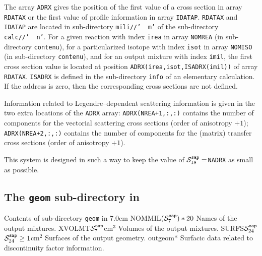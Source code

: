 The array {\tt ADRX} gives the position of the first value of a cross section in array {\tt RDATAX}
or the first value of profile information in array {\tt IDATAP}. {\tt RDATAX} and {\tt IDATAP} are
located in sub-directory {\tt mili//'~~m'} of the sub-directory {\tt calc//'~~n'}.
For a given reaction with index {\tt irea} in array {\tt NOMREA} (in sub-directory {\tt contenu}),
for a particularized isotope with index {\tt isot} in array {\tt NOMISO} (in sub-directory {\tt contenu}),
and for an output mixture with index {\tt imil}, the first cross section value is located at position
{\tt ADRX(irea,isot,ISADRX(imil))} of array {\tt RDATAX}. {\tt ISADRX} is defined in the sub-directory
{\tt info} of an elementary calculation. If the address is zero, then the corresponding cross sections
are not defined.

\vskip 0.1cm

Information related to Legendre--dependent scattering information is given in the two
extra locations of the {\tt ADRX} array: {\tt ADRX(NREA+1,:,:)} contains the number of components for the
vectorial scattering cross sections (order of anisotropy $+1$); {\tt ADRX(NREA+2,:,:)} contains the
num\-ber of components for the (matrix) transfer cross sections (order of anisotropy $+1$).

\vskip 0.1cm

This system is designed in such a way to keep the value of $\mathcal{S}^{\tt sap}_{18}=${\tt NADRX} as
small as possible.

\newpage
\subsection{The {\tt geom} sub-directory in }\label{sect:sapdirgeom}

\vskip -0.5cm

\begin{DescriptionEnregistrement}{Contents of sub-directory {\tt geom} in }{7.0cm}
\CharEnr
  {NOMMIL}{$(\mathcal{S}^{\tt sap}_7)*20$}
  {Names of the output mixtures.}
\RealEnr
  {XVOLMT}{$\mathcal{S}^{\tt sap}_7$}{cm$^3$}
  {Volumes of the output mixtures.}
\OptRealEnr
  {SURFS}{$\mathcal{S}^{\tt sap}_{24}$}{$\mathcal{S}^{\tt sap}_{24}\ge 1$}{cm$^2$}
  {Surfaces of the output geometry.}
\OptDirEnr
  {outgeom}{*}
  {Surfacic data related to discontinuity factor information.}
\end{DescriptionEnregistrement}

\vskip -0.5cm

